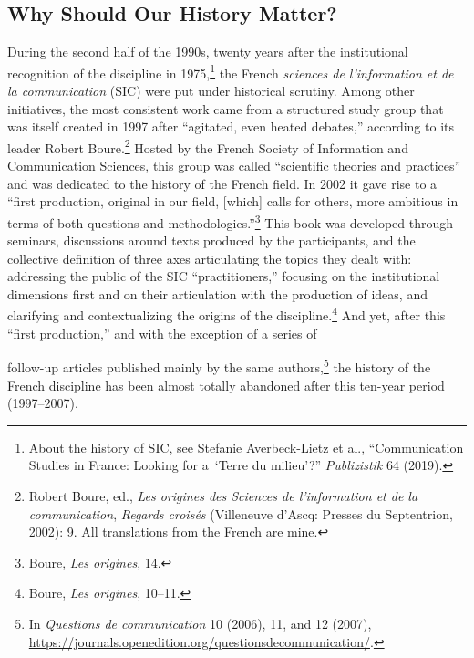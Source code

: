 \documentclass{tufte-handout}
\begin{document}
\begin{titlepage}
\hypertarget{why-should-our-history-matter}{%
\section{Why Should Our History
Matter?}\label{why-should-our-history-matter}}

During the second half of the 1990s, twenty years after the
institutional recognition of the discipline in
1975,\footnote{About the history of SIC, see Stefanie Averbeck-Lietz et al.,
  ``Communication Studies in France: Looking for a~`Terre du milieu'?''
  \emph{Publizistik} 64 (2019).
} the French \emph{sciences de
l'information et de la communication} (SIC) were put under historical
scrutiny. Among other initiatives, the most consistent work came from a
structured study group that was itself created in 1997 after ``agitated,
even heated debates,'' according to its leader Robert
Boure.\footnote{Robert Boure, ed., \emph{Les origines des Sciences de l'information et
  de la communication}, \emph{Regards croisés} (Villeneuve d'Ascq:
  Presses du Septentrion, 2002): 9. All translations from the French are
  mine.
} Hosted by the French
Society of Information and Communication Sciences, this group was called
``scientific theories and practices'' and was dedicated to the history
of the French field. In 2002 it gave rise to a ``first production,
original in our field, {[}which{]} calls for others, more ambitious in
terms of both questions and
methodologies.''\footnote{Boure, \emph{Les origines}, 14.
} This book was
developed through seminars, discussions around texts produced by the
participants, and the collective definition of three axes articulating
the topics they dealt with: addressing the public of the SIC
``practitioners,'' focusing on the institutional dimensions first and on
their articulation with the production of ideas, and clarifying and
contextualizing the origins of the
discipline.\footnote{Boure, \emph{Les origines}, 10--11.
} And yet, after this
``first production,'' and with the exception of a series of
\enlargethispage{2\baselineskip}

\vspace*{2em}





 \end{titlepage}


\noindent follow-up
articles published mainly by the same
authors,\footnote{In \emph{Questions de communication} 10 (2006), 11, and 12 (2007),
  \url{https://journals.openedition.org/questionsdecommunication/}.
} the history of the French
discipline has been almost totally abandoned after this ten-year period
(1997--2007).
\end{document}
